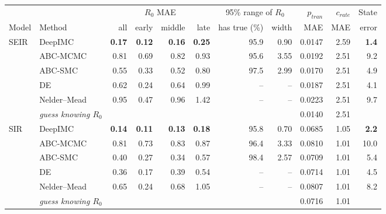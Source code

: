 \begin{tabular}{llrrrrrrrrr}
\toprule
 &  & \multicolumn{4}{c}{$R_0$ MAE} & \multicolumn{2}{c}{95\% range of $R_0$} & $p_{tran}$ & $c_{rate}$ & State \\
\cmidrule(lr){3-6}\cmidrule(lr){7-8}
Model & Method & all & early & middle & late & has true (\%) & width & MAE & MAE & error \\
\midrule
SEIR & DeepIMC & \textbf{0.17} & \textbf{0.12} & \textbf{0.16} & \textbf{0.25} & 95.9 & 0.90 & 0.0147 & 2.59 & \textbf{1.4} \\
 & ABC-MCMC & 0.81 & 0.69 & 0.82 & 0.93 & 95.6 & 3.55 & 0.0192 & 2.51 & 9.2 \\
 & ABC-SMC & 0.55 & 0.33 & 0.52 & 0.80 & 97.5 & 2.99 & 0.0170 & 2.51 & 4.9 \\
 & DE & 0.62 & 0.24 & 0.64 & 0.99 & -- & -- & 0.0187 & 2.51 & 4.1 \\
 & Nelder--Mead & 0.95 & 0.47 & 0.96 & 1.42 & -- & -- & 0.0223 & 2.51 & 9.7 \\
 & \textit{guess knowing $R_0$} &  &  &  &  &  &  & 0.0140 & 2.51 &  \\
\midrule
SIR & DeepIMC & \textbf{0.14} & \textbf{0.11} & \textbf{0.13} & \textbf{0.18} & 95.8 & 0.70 & 0.0685 & 1.05 & \textbf{2.2} \\
 & ABC-MCMC & 0.81 & 0.73 & 0.83 & 0.87 & 96.4 & 3.33 & 0.0810 & 1.01 & 10.0 \\
 & ABC-SMC & 0.40 & 0.27 & 0.34 & 0.57 & 98.4 & 2.57 & 0.0709 & 1.01 & 5.4 \\
 & DE & 0.36 & 0.17 & 0.39 & 0.54 & -- & -- & 0.0714 & 1.01 & 4.5 \\
 & Nelder--Mead & 0.65 & 0.24 & 0.68 & 1.05 & -- & -- & 0.0807 & 1.01 & 8.2 \\
 & \textit{guess knowing $R_0$} &  &  &  &  &  &  & 0.0716 & 1.01 &  \\
\bottomrule
\end{tabular}
